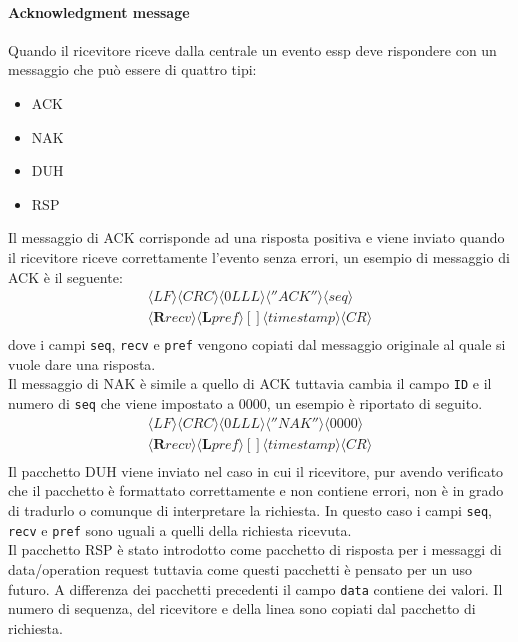 \paragraph{Acknowledgment message}
Quando il ricevitore riceve dalla centrale un evento essp deve rispondere con un messaggio che può essere di quattro tipi:
\begin{itemize}
	\item ACK
	\item NAK
	\item DUH
	\item RSP
\end{itemize}
Il messaggio di ACK corrisponde ad una risposta positiva e viene inviato quando il ricevitore riceve correttamente l'evento senza errori, un esempio di messaggio di ACK è il seguente:
$$
\begin{array}{c}
\langle LF\rangle\langle CRC\rangle\langle 0LLL\rangle\langle ''ACK''\rangle\langle seq\rangle\\\langle\textbf{R}recv\rangle\langle\textbf{L}pref\rangle
{[]}\langle timestamp\rangle \langle CR\rangle\\
\end{array}	 
$$
dove i campi \texttt{seq}, \texttt{recv} e \texttt{pref} vengono copiati dal messaggio originale al quale si vuole dare una risposta.\\
Il messaggio di NAK è simile a quello di ACK tuttavia cambia il campo \texttt{ID} e il numero di \texttt{seq} che viene impostato a 0000, un esempio è riportato di seguito.
$$
\begin{array}{c}
\langle LF\rangle\langle CRC\rangle\langle 0LLL\rangle\langle ''NAK''\rangle\langle 0000\rangle\\\langle\textbf{R}recv\rangle\langle\textbf{L}pref\rangle
{[]}\langle timestamp\rangle \langle CR\rangle\\
\end{array}	 
$$
Il pacchetto DUH viene inviato nel caso in cui il ricevitore, pur avendo verificato che il pacchetto è formattato correttamente e non contiene errori, non è in grado di tradurlo o comunque di interpretare la richiesta. In questo caso i campi \texttt{seq}, \texttt{recv} e \texttt{pref} sono uguali a quelli della richiesta ricevuta.\\
Il pacchetto RSP è stato introdotto come pacchetto di risposta per i messaggi di data/operation request tuttavia come questi pacchetti è pensato per un uso futuro. A differenza dei pacchetti precedenti il campo \texttt{data} contiene dei valori. Il numero di sequenza, del ricevitore e della linea sono copiati dal pacchetto di richiesta.
